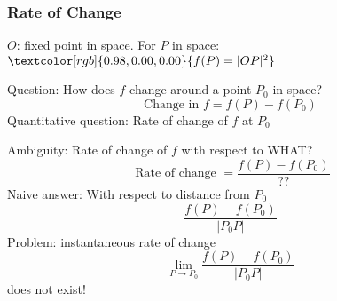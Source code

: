 \begin{frame}
  \frametitle{Rate of Change}

  $O$: fixed point in space. For $P$ in space:
  $\textcolor[rgb]{0.98,0.00,0.00}{f(P) = |OP|^2}$

  Question: How does $f$ change around a point $P_0$ in space? \pause
  $$\text{Change in } f = f(P) - f(P_0)$$
  \pause \textcolor[rgb]{0.98,0.00,0.00}{Quantitative} question: \pause
  \textcolor[rgb]{0.98,0.00,0.00}{Rate of change} of $f$ at $P_0$

  \pause Ambiguity: \pause Rate of change of $f$ with respect to WHAT?
  $$\text{ Rate of change } = \frac{f(P) - f(P_0)}{??}$$
  \pause Naive answer: \pause With respect to
  \textcolor[rgb]{0.00,0.00,0.00}{distance} from $P_0$
  $$\frac{f(P) - f(P_0)}{|P_0P|}$$
  \pause Problem: \pause
  \textcolor[rgb]{0.98,0.00,0.00}{instantaneous rate of change}
  $$\lim_{P\to P_0} \frac{f(P)-f(P_0)}{|P_0P|}$$
  does not exist!
\end{frame}
